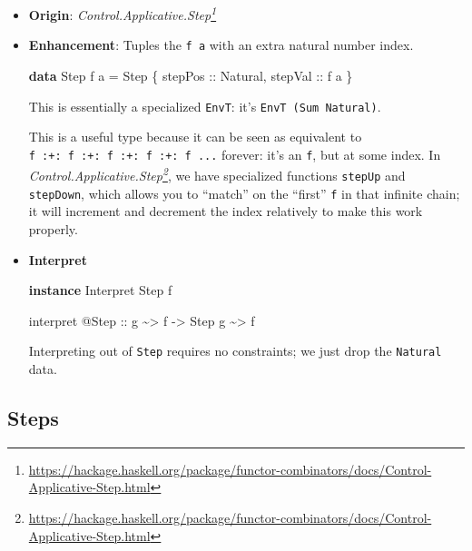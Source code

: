 \documentclass[]{article}
\newenvironment{Shaded}{}{}
\newcommand{\DataTypeTok}[1]{\textcolor[rgb]{0.56,0.13,0.00}{#1}}
\newcommand{\KeywordTok}[1]{\textcolor[rgb]{0.00,0.44,0.13}{\textbf{#1}}}
\newcommand{\NormalTok}[1]{#1}
\newcommand{\OperatorTok}[1]{\textcolor[rgb]{0.40,0.40,0.40}{#1}}
\newcommand{\OtherTok}[1]{\textcolor[rgb]{0.00,0.44,0.13}{#1}}
\renewcommand{\href}[2]{#2\footnote{\url{#1}}}
\begin{document}
\begin{itemize}
\item
  \textbf{Origin}:
  \emph{\href{https://hackage.haskell.org/package/functor-combinators/docs/Control-Applicative-Step.html}{Control.Applicative.Step}}
\item
  \textbf{Enhancement}: Tuples the \texttt{f\ a} with an extra natural number
  index.

\begin{Shaded}
\begin{Highlighting}[]
\KeywordTok{data} \DataTypeTok{Step}\NormalTok{ f a }\OtherTok{=} \DataTypeTok{Step}\NormalTok{ \{}\OtherTok{ stepPos ::} \DataTypeTok{Natural}\NormalTok{,}\OtherTok{ stepVal ::}\NormalTok{ f a \}}
\end{Highlighting}
\end{Shaded}

  This is essentially a specialized \texttt{EnvT}: it's
  \texttt{EnvT\ (Sum\ Natural)}.

  This is a useful type because it can be seen as equivalent to
  \texttt{f\ :+:\ f\ :+:\ f\ :+:\ f\ :+:\ f\ ...} forever: it's an \texttt{f},
  but at some index. In
  \emph{\href{https://hackage.haskell.org/package/functor-combinators/docs/Control-Applicative-Step.html}{Control.Applicative.Step}},
  we have specialized functions \texttt{stepUp} and \texttt{stepDown}, which
  allows you to ``match'' on the ``first'' \texttt{f} in that infinite chain; it
  will increment and decrement the index relatively to make this work properly.
\item
  \textbf{Interpret}

\begin{Shaded}
\begin{Highlighting}[]
\KeywordTok{instance} \DataTypeTok{Interpret} \DataTypeTok{Step}\NormalTok{ f}

\NormalTok{interpret }\OperatorTok{@}\DataTypeTok{Step}
\OtherTok{    ::}\NormalTok{ g }\OperatorTok{\textasciitilde{}>}\NormalTok{ f}
    \OtherTok{{-}>} \DataTypeTok{Step}\NormalTok{ g }\OperatorTok{\textasciitilde{}>}\NormalTok{ f}
\end{Highlighting}
\end{Shaded}

  Interpreting out of \texttt{Step} requires no constraints; we just drop the
  \texttt{Natural} data.
\end{itemize}

\hypertarget{steps}{%
\subsection{Steps}\label{steps}}
\end{document}

